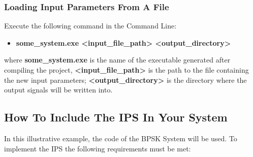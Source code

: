 \subsubsection{Loading Input Parameters From A File}
Execute the following command in the Command Line:
\begin{itemize}
  \item[] \textbf{some\_system.exe <input\_file\_path> <output\_directory>}
\end{itemize}
%
where \textbf{some\_system.exe} is the name of the executable generated after compiling the project, \textbf{<input\_file\_path>} is the path to the file containing the new input parameters; \textbf{<output\_directory>} is the directory where the output signals will be written into.

\subsection{How To Include The IPS In Your System}
In this illustrative example, the code of the BPSK System will be used. To implement the IPS the following requirements must be met:
